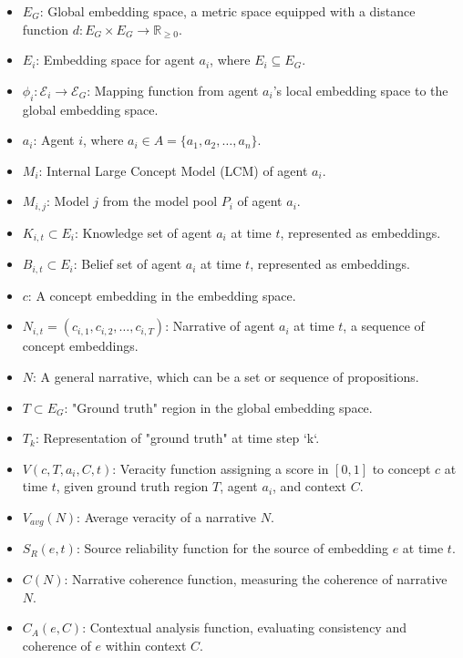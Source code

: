 \documentclass[12pt, a4paper]{article}
\begin{document}
\begin{itemize}
    \item \( E_G \): Global embedding space, a metric space equipped with a distance function \( d: E_G \times E_G \rightarrow \mathbb{R}_{\geq 0} \).
    \item \( E_i \): Embedding space for agent \( a_i \), where \( E_i \subseteq E_G \).
    \item \( \phi_i: \mathcal{E}_i \rightarrow \mathcal{E}_G \): Mapping function from agent \( a_i \)'s local embedding space to the global embedding space.
    \item \( a_i \): Agent \( i \), where \( a_i \in A = \{a_1, a_2, \dots, a_n\} \).
    \item \( M_i \): Internal Large Concept Model (LCM) of agent \( a_i \).
    \item \( M_{i,j} \): Model \(j\) from the model pool \(P_i\) of agent \( a_i \).
    \item \( K_{i,t} \subset E_i \): Knowledge set of agent \( a_i \) at time \( t \), represented as embeddings.
    \item \( B_{i,t} \subset E_i \): Belief set of agent \( a_i \) at time \( t \), represented as embeddings.
    \item \( c \): A concept embedding in the embedding space.
    \item \( N_{i,t} = (c_{i,1}, c_{i,2}, \dots, c_{i,T}) \): Narrative of agent \( a_i \) at time \( t \), a sequence of concept embeddings.
    \item \( N \): A general narrative, which can be a set or sequence of propositions.
    \item \( T \subset E_G \): "Ground truth" region in the global embedding space.
    \item \( T_k \): Representation of "ground truth" at time step `k`.
    \item \( V(c, T, a_i, C, t) \): Veracity function assigning a score in \([0, 1]\) to concept \( c \) at time \(t\), given ground truth region \( T \), agent \( a_i \), and context \( C \).
    \item \( V_{avg}(N) \): Average veracity of a narrative \( N \).
    \item \( S_R(e,t) \): Source reliability function for the source of embedding \(e\) at time \(t\).
    \item \( C(N) \): Narrative coherence function, measuring the coherence of narrative \( N \).
    \item \( C_A(e, C) \): Contextual analysis function, evaluating consistency and coherence of \( e \) within context \( C \).

\end{itemize}
\end{document}
